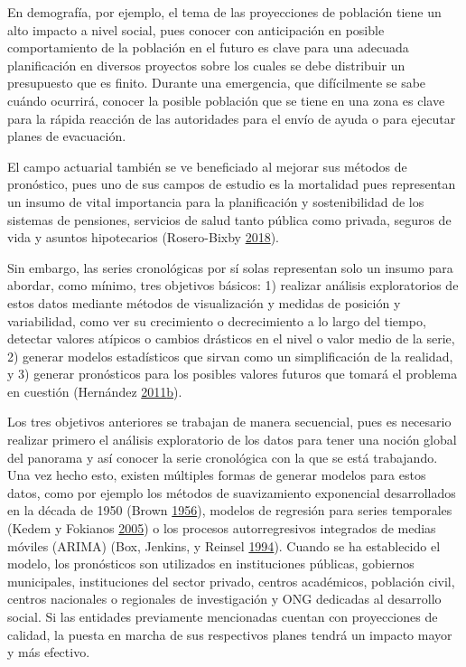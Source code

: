 \documentclass[12pt]{article}
\begin{document}
En demografía, por ejemplo, el tema de las proyecciones de población
tiene un alto impacto a nivel social, pues conocer con anticipación en
posible comportamiento de la población en el futuro es clave para una
adecuada planificación en diversos proyectos sobre los cuales se debe
distribuir un presupuesto que es finito. Durante una emergencia, que
difícilmente se sabe cuándo ocurrirá, conocer la posible población que
se tiene en una zona es clave para la rápida reacción de las autoridades
para el envío de ayuda o para ejecutar planes de evacuación.

El campo actuarial también se ve beneficiado al mejorar sus métodos de
pronóstico, pues uno de sus campos de estudio es la mortalidad pues
representan un insumo de vital importancia para la planificación y
sostenibilidad de los sistemas de pensiones, servicios de salud tanto
pública como privada, seguros de vida y asuntos hipotecarios
(Rosero-Bixby \protect\hyperlink{ref-supenprodc}{2018}).

Sin embargo, las series cronológicas por sí solas representan solo un
insumo para abordar, como mínimo, tres objetivos básicos: 1) realizar
análisis exploratorios de estos datos mediante métodos de visualización
y medidas de posición y variabilidad, como ver su crecimiento o
decrecimiento a lo largo del tiempo, detectar valores atípicos o cambios
drásticos en el nivel o valor medio de la serie, 2) generar modelos
estadísticos que sirvan como un simplificación de la realidad, y 3)
generar pronósticos para los posibles valores futuros que tomará el
problema en cuestión (Hernández
\protect\hyperlink{ref-oscarh-2}{2011}\protect\hyperlink{ref-oscarh-2}{b}).

Los tres objetivos anteriores se trabajan de manera secuencial, pues es
necesario realizar primero el análisis exploratorio de los datos para
tener una noción global del panorama y así conocer la serie cronológica
con la que se está trabajando. Una vez hecho esto, existen múltiples
formas de generar modelos para estos datos, como por ejemplo los métodos
de suavizamiento exponencial desarrollados en la década de 1950 (Brown
\protect\hyperlink{ref-brown}{1956}), modelos de regresión para series
temporales (Kedem y Fokianos \protect\hyperlink{ref-kedem}{2005}) o
los procesos autorregresivos integrados de medias móviles (ARIMA) (Box,
Jenkins, y Reinsel \protect\hyperlink{ref-box-jenkins}{1994}). Cuando
se ha establecido el modelo, los pronósticos son utilizados en
instituciones públicas, gobiernos municipales, instituciones del sector
privado, centros académicos, población civil, centros nacionales o
regionales de investigación y ONG dedicadas al desarrollo social. Si las
entidades previamente mencionadas cuentan con proyecciones de calidad,
la puesta en marcha de sus respectivos planes tendrá un impacto mayor y
más efectivo.
\end{document}
